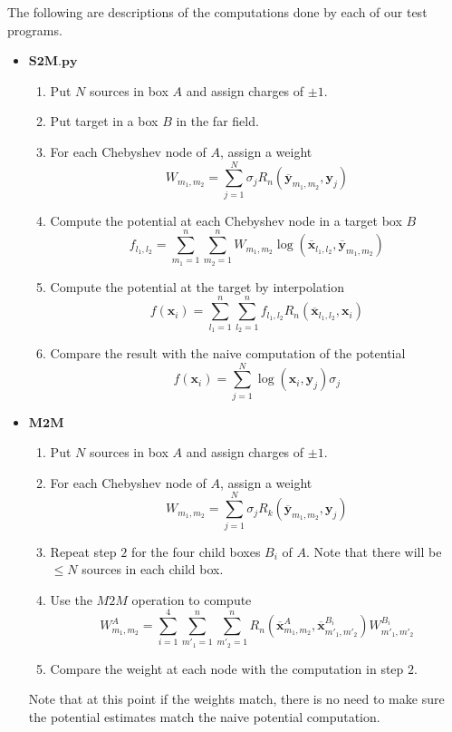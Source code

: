 \documentclass[11pt, oneside]{article}   	%
\begin{document}
\begin{appendices}
The following are descriptions of the computations done by each of our test programs.\\
\begin{itemize}
\item $\mathbf{S2M.py}$
\begin{enumerate}
\item Put $N$ sources in box $A$ and assign charges of $\pm 1$.
\item Put target in a box $B$ in the far field.
\item For each Chebyshev node of $A$, assign a weight\\
$$W_{m_1,m_2}=\sum_{j=1}^N \sigma_j R_n(\mathbf{\overline{y}}_{m_1,m_2},\mathbf{y}_j)$$
\item Compute the potential at each Chebyshev node in a target box $B$\\
$$f_{l_1,l_2}=\sum_{m_1=1}^n\sum_{m_2=1}^n W_{m_1,m_2} \log(\mathbf{\overline{x}}_{l_1,l_2},\mathbf{\overline{y}}_{m_1,m_2})$$
\item Compute the potential at the target by interpolation\\
$$f(\mathbf{x}_i)=\sum_{l_1=1}^n\sum_{l_2=1}^n f_{l_1,l_2} R_n(\mathbf{\overline{x}}_{l_1,l_2},\mathbf{x}_i)$$
\item Compare the result with the naive computation of the potential\\
$$f(\mathbf{x}_i)=\sum_{j=1}^N \log(\mathbf{x}_i,\mathbf{y}_j) \sigma_j$$
\end{enumerate}

\item $\mathbf{M2M}$
\begin{enumerate}
\item Put $N$ sources in box $A$ and assign charges of $\pm 1$.
\item For each Chebyshev node of $A$, assign a weight\\
$$W_{m_1,m_2}=\sum_{j=1}^N \sigma_jR_k(\mathbf{\overline{y}}_{m_1,m_2},\mathbf{y}_j)$$
\item Repeat step $2$ for the four child boxes $B_i$ of $A$. Note that there will be $\le N$ sources in each child box.
\item Use the $M2M$ operation to compute\\
$$W^A_{m_1,m_2}= \sum_{i=1}^4\sum_{m'_1=1}^n\sum_{m'_2=1}^n R_n(\mathbf{\overline{x}}^{A}_{m_1,m_2},\mathbf{\overline{x}}^{B_i}_{m'_1,m'_2})W^{B_i}_{m'_1,m'_2}$$
\item Compare the weight at each node with the computation in step $2$.
\end{enumerate}
Note that at this point if the weights match, there is no need to make sure the potential estimates match the naive potential computation.\\


\end{itemize}
\end{appendices}
\end{document}
